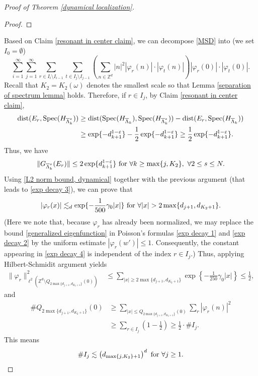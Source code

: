 \documentclass[11pt,reqno,UTF8,twoside]{amsart}
\newcommand{\Z}{\mathbb{Z}}
\newcommand{\spec}{{\rm Spec}}
\newcommand{\barLambda}{\overline{\Lambda}}
\newcommand{\dist}{{\rm dist}}
\theoremstyle{definition}
\numberwithin{equation}{section}
\begin{document}
\begin{proof}[Proof of Theorem \ref{dynamical localization}]
\begin{proof}
\end{proof}

Based on Claim \ref{resonant in center claim}, we can decompose \eqref{MSD} into  (we set $I_0=\emptyset$)
\begin{equation}\label{decompose MSD 1}
  \sum_{i=1}^{\infty} \sum_{j=1}^{\infty} \sum_{r\in I_i\setminus I_{i-1}} \sum_{t\in I_{j}\setminus I_{j-1}} \left( \sum_{n\in \Z^d}  |n|^2 |\varphi_r(n)|\cdot |\varphi_t(n)|\right) |\varphi_r(0)| \cdot | \varphi_t(0)|.
\end{equation}
Recall that $K_2=K_2(\omega)$ denotes the smallest scale  so that Lemma \ref{separation of spectrum lemma} holds. Therefore, if $r\in I_j$, by Claim \ref{resonant in center claim},  
\begin{align*}
  \dist(E_r,\spec(H_{\barLambda_k^s})) & \geq \dist(\spec(H_{\barLambda_k}),\spec(H_{\barLambda_k^s}))-\dist(E_r,\spec(H_{\barLambda_k})) \\
     &\geq \exp\{-d_{k+1}^{1-\varepsilon}\}-\frac{1}{2}\exp\{-d_{k+1}^{1-\varepsilon}\} \geq \frac{1}{2}\exp\{-d_{k+1}^{1-\varepsilon}\}.
\end{align*}
Thus, we have 
\begin{equation}\label{L2 norm bound, dynamical}
  \|G_{\barLambda_k^s}(E_r) \| \leq 2\exp\{d_{k+1}^{1-\varepsilon}\}\ {\rm for} \ \forall k\geq \max\{j, K_2\},\ \forall 2\leq s\leq N.
\end{equation}
Using  \eqref{L2 norm bound, dynamical} together with the previous argument (that leads to \eqref{exp decay 3}), we can prove that 
\begin{equation}\label{exp decay 4}
  |\varphi_r(x)|\lesssim_{d} \exp\{-\frac{1}{500}\gamma_0 |x|\}\ {\rm for}\ \forall |x| > 2 \max\{d_{j+1}, d_{K_2+1} \}.
\end{equation}
(Here we note that, because $\varphi_r$ has already been normalized, we may replace the bound \eqref{generalized eigenfunction} in Poisson’s formulas \eqref{exp decay 1} and \eqref{exp decay 2} by the uniform estimate $|\varphi_r(w')|\leq 1$. Consequently, the constant appearing in \eqref{exp decay 4} is independent of the index $r\in I_j$.) Thus, applying Hilbert-Schmidit argument yields
\begin{align*}
  \| \varphi_r \| ^2_{\ell^2(\Z^d\setminus Q_{2 \max\{d_{j+1}, d_{K_2+1} \}}(0))} & \leq \sum_{|x|\geq 2 \max\{d_{j+1}, d_{K_2+1} \}} \exp \left\{-\frac{1}{250}\gamma_0 |x|\right\} \leq \frac{1}{2},
\end{align*}
and 
\begin{align*}
  \# Q_{2 \max\{d_{j+1}, d_{K_2+1} \}}(0)&\geq \sum_{|x|\leq Q_{2 \max\{d_{j+1}, d_{K_2+1} \}}(0)}  \sum_{r} |\varphi_r(n)|^2 \\
     & \geq \sum_{r\in I_j} (1-\frac{1}{2})\geq \frac{1}{2} \cdot \# I_j.
\end{align*}
This means 
\begin{equation}\label{number of Ij}
  \# I_j \lesssim \left( d_{\max\{j,K_2\}+1} \right)^d\ {\rm for}\  \forall j\geq 1.
\end{equation}



\end{proof}
\end{document}
